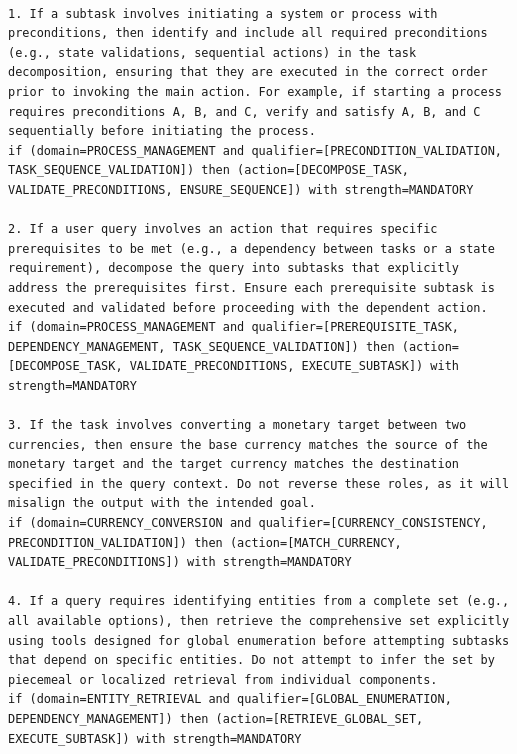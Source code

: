\begin{lstlisting}[style=rulestyle, caption={Sample rules learned from the BFCL: Multi-Turn-Base dataset}]

1. If a subtask involves initiating a system or process with preconditions, then identify and include all required preconditions (e.g., state validations, sequential actions) in the task decomposition, ensuring that they are executed in the correct order prior to invoking the main action. For example, if starting a process requires preconditions A, B, and C, verify and satisfy A, B, and C sequentially before initiating the process.
if (domain=PROCESS_MANAGEMENT and qualifier=[PRECONDITION_VALIDATION, TASK_SEQUENCE_VALIDATION]) then (action=[DECOMPOSE_TASK, VALIDATE_PRECONDITIONS, ENSURE_SEQUENCE]) with strength=MANDATORY

2. If a user query involves an action that requires specific prerequisites to be met (e.g., a dependency between tasks or a state requirement), decompose the query into subtasks that explicitly address the prerequisites first. Ensure each prerequisite subtask is executed and validated before proceeding with the dependent action.
if (domain=PROCESS_MANAGEMENT and qualifier=[PREREQUISITE_TASK, DEPENDENCY_MANAGEMENT, TASK_SEQUENCE_VALIDATION]) then (action=[DECOMPOSE_TASK, VALIDATE_PRECONDITIONS, EXECUTE_SUBTASK]) with strength=MANDATORY

3. If the task involves converting a monetary target between two currencies, then ensure the base currency matches the source of the monetary target and the target currency matches the destination specified in the query context. Do not reverse these roles, as it will misalign the output with the intended goal.
if (domain=CURRENCY_CONVERSION and qualifier=[CURRENCY_CONSISTENCY, PRECONDITION_VALIDATION]) then (action=[MATCH_CURRENCY, VALIDATE_PRECONDITIONS]) with strength=MANDATORY

4. If a query requires identifying entities from a complete set (e.g., all available options), then retrieve the comprehensive set explicitly using tools designed for global enumeration before attempting subtasks that depend on specific entities. Do not attempt to infer the set by piecemeal or localized retrieval from individual components.
if (domain=ENTITY_RETRIEVAL and qualifier=[GLOBAL_ENUMERATION, DEPENDENCY_MANAGEMENT]) then (action=[RETRIEVE_GLOBAL_SET, EXECUTE_SUBTASK]) with strength=MANDATORY

\end{lstlisting}

